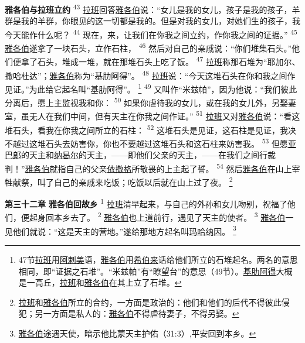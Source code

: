 \textbf{雅各伯与拉班立约 }
\textsuperscript{43}
\uline{拉班}回答\uline{雅各伯}说：“女儿是我的女儿，孩子是我的孩子，羊群是我的羊群，你眼见的这一切都是我的。但是对我的女儿，对她们生的孩子，我今天能作什么呢？
\textsuperscript{44}
现在，来，让我们在你我之间立约，作你我之间的证据。”
\textsuperscript{45}
\uline{雅各伯}遂拿了一块石头，立作石柱，
\textsuperscript{46}
然后对自己的亲戚说：“你们堆集石头。”他们便拿了石头，堆成一堆，就在那堆石头上吃了饭。
\textsuperscript{47}
\uline{拉班}称那石堆为“耶加尔、撒哈杜达”；\uline{雅各伯}称为“基肋阿得”。
\textsuperscript{48}
\uline{拉班}说：“今天这堆石头在你和我之间作见证。”为此给它起名叫“基肋阿得”。
\footnote{47节\uline{拉班}用\uline{阿剌美}语，\uline{雅各伯}用\uline{希伯来}话给他们所立的石堆起名。两名的意思相同，即“证据之石堆”。“米兹帕”有“瞭望台”的意思（49节）。\uline{基肋阿得}大概是一高丘，\uline{拉班}和\uline{雅各伯}在其上立了石堆。}
\textsuperscript{49}
又叫作“米兹帕”，因为他说：“我们彼此分离后，愿上主监视我和你：
\textsuperscript{50}
如果你虐待我的女儿，或在我的女儿外，另娶妻室，虽无人在我们中间，但有天主在你我之间作证。”
\textsuperscript{51}
\uline{拉班}又对\uline{雅各伯}说：“看这堆石头，看我在你我之间所立的石柱：
\textsuperscript{52}
这堆石头是见证，这石柱是见证，我决不越过这堆石头去妨害你，你也不要越过这堆石头和这石柱来妨害我。
\textsuperscript{53}
但愿\uline{亚巴郎}的天主和\uline{纳曷尔}的天主，——即他们父亲的天主，——在我们之间行裁判！”\uline{雅各伯}就指自己的父亲\uline{依撒格}所敬畏的上主起了誓。
\textsuperscript{54}
然后\uline{雅各伯}在山上宰牲献祭，叫了自己的亲戚来吃饭；吃饭以后就在山上过了夜。
\footnote{\uline{拉班}和\uline{雅各伯}所立的合约，一方面是政治的：他们和他们的后代不得彼此侵犯；另一方面是私人的：\uline{雅各伯}不得虐待妻子，不得另娶。}

\textbf{第三十二章 }
\textbf{雅各伯回故乡 }
\textsuperscript{1}
\uline{拉班}清早起来，与自己的外孙和女儿吻别，祝福了他们，便起身回本乡去了。
\textsuperscript{2}
\uline{雅各伯}也上道前行，遇见了天主的使者。
\textsuperscript{3}
\uline{雅各伯}一见他们就说：“这是天主的营地。”遂给那地方起名叫\uline{玛哈}\uline{纳因}。
\footnote{\uline{雅各伯}途遇天使，暗示他比蒙天主护佑（31:3）,平安回到本乡。}

